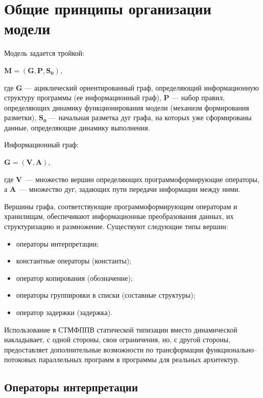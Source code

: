 \section{Общие принципы организации модели}

Модель задается тройкой:

\begin{center}
	\large$\mathbf{M = ( G, P, S_0 )}$\normalsize,
\end{center}
где $\mathbf{G}$ --- ациклический ориентированный граф, определяющий информационную структуру программы (ее информационный граф), $\mathbf{P}$ --- набор правил, определяющих динамику функционирования модели (механизм формирования разметки), $\mathbf{S_0}$ --- начальная разметка дуг графа, на которых уже сформированы данные, определяющие динамику выполнения.

Информационный граф:

\begin{center}
	\large$\mathbf{G = ( V, A )}$\normalsize,
\end{center}
где $\mathbf{V}$~--- множество вершин определяющих программоформирующие операторы, а $\mathbf{A}$~--- множество дуг, задающих пути передачи информации между ними.

Вершины графа, соответствующие программоформирующим операторам и хранилищам, обеспечивают информационные преобразования данных, их структуризацию и размножение. Существуют следующие типы вершин:
\begin{itemize}
	\item операторы интерпретации;
	\item константные операторы (константы);
	\item оператор копирования (обозначение);
	\item операторы группировки в списки (составные структуры);
	\item оператор задержки (задержка).
\end{itemize}
Использование в СТМФППВ статической типизации вместо динамической накладывает, с одной стороны, свои ограничения, но, с другой стороны, предоставляет дополнительные возможности по трансформации функционально--потоковых параллельных программ в программы для реальных архитектур.

\subsection{Операторы интерпретации}


